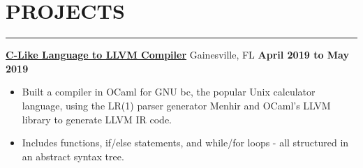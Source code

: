 \section*{PROJECTS}

\hrule \relax
\sectionheaderspace

\noindent \href{https://github.com/hodsonus/programming-language-concepts}{\textbf{C-Like Language to LLVM Compiler}} Gainesville, FL  \hfill\textbf{April 2019 to May 2019}
\begin{itemize}[noitemsep,nolistsep, label={-}]
	\item Built a compiler in OCaml for GNU bc, the popular Unix calculator language, using the LR(1) parser generator Menhir and OCaml's LLVM library to generate LLVM IR code.
	\item Includes functions, if/else statements, and while/for loops - all structured in an abstract syntax tree.
\end{itemize}
\subsectionspace